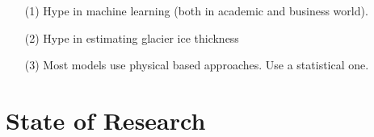 \begin{itemize}
	\item[(1)] Hype in machine learning (both in academic and business world).
	\item[(2)] Hype in estimating glacier ice thickness
	\item[(3)] Most models use physical based approaches. Use a statistical one.
\end{itemize}
 


\section{State of Research}\label{research}


%
%

